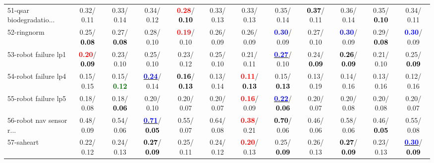 \begin{table}[h]
\begin{center}
{\begin{tabular}{lc|c|c|c|c|c|c|c|c|c|c}
51-qsar biodegradatio... &   0.32/  0.11 &   0.33/  0.14 &   0.34/  0.12 & \textcolor{red}{\textbf{  0.28}}/\textcolor{black}{\textbf{  0.10}} &   0.33/  0.13 &   0.33/  0.13 &   0.35/  0.14 & \textcolor{black}{\textbf{  0.37}}/  0.11 &   0.36/  0.14 &   0.35/\textcolor{black}{\textbf{  0.10}} &   0.34/  0.11 \\
52-ringnorm &   0.25/\textcolor{black}{\textbf{  0.08}} &   0.27/\textcolor{black}{\textbf{  0.08}} &   0.28/  0.10 & \textcolor{red}{\textbf{  0.19}}/  0.10 &   0.26/  0.09 &   0.26/  0.09 & \textcolor{blue}{\textbf{  0.30}}/  0.09 &   0.27/  0.10 & \textcolor{blue}{\textbf{  0.30}}/  0.09 &   0.29/\textcolor{black}{\textbf{  0.08}} & \textcolor{blue}{\textbf{  0.30}}/  0.09 \\
53-robot failure lp1 & \textcolor{red}{\textbf{  0.20}}/\textcolor{black}{\textbf{  0.09}} &   0.23/  0.10 &   0.25/  0.10 &   0.23/  0.12 &   0.25/  0.10 &   0.21/  0.11 & \underline{\textcolor{blue}{\textbf{  0.27}}}/  0.10 &   0.24/\textcolor{black}{\textbf{  0.09}} & \textcolor{black}{\textbf{  0.26}}/\textcolor{black}{\textbf{  0.09}} &   0.21/  0.10 &   0.25/\textcolor{black}{\textbf{  0.09}} \\ \hline
54-robot failure lp4 &   0.15/  0.15 &   0.15/\textcolor{darkgreen}{\textbf{  0.12}} & \underline{\textcolor{blue}{\textbf{  0.24}}}/  0.14 & \textcolor{black}{\textbf{  0.16}}/\textcolor{black}{\textbf{  0.13}} &   0.13/  0.14 & \textcolor{red}{\textbf{  0.11}}/\textcolor{black}{\textbf{  0.13}} &   0.15/\textcolor{black}{\textbf{  0.13}} &   0.13/  0.19 &   0.14/  0.16 &   0.13/  0.16 &   0.12/  0.16 \\
55-robot failure lp5 &   0.18/  0.08 &   0.18/\textcolor{black}{\textbf{  0.06}} &   0.20/  0.10 &   0.20/  0.07 &   0.20/  0.07 & \textcolor{red}{\textbf{  0.16}}/  0.09 & \underline{\textcolor{blue}{\textbf{  0.22}}}/\textcolor{black}{\textbf{  0.06}} &   0.20/  0.07 &   0.20/  0.08 &   0.20/  0.08 &   0.20/  0.07 \\
56-robot nav sensor r... &   0.48/  0.09 &   0.54/  0.06 & \underline{\textcolor{blue}{\textbf{  0.71}}}/\textcolor{black}{\textbf{  0.05}} &   0.55/  0.07 &   0.64/  0.08 & \textcolor{red}{\textbf{  0.38}}/  0.21 & \textcolor{black}{\textbf{  0.70}}/  0.06 &   0.46/  0.06 &   0.58/  0.06 &   0.46/\textcolor{black}{\textbf{  0.05}} &   0.55/  0.08 \\
57-saheart &   0.22/  0.12 &   0.24/  0.13 & \textcolor{black}{\textbf{  0.27}}/\textcolor{black}{\textbf{  0.09}} &   0.25/  0.11 &   0.24/  0.12 & \textcolor{red}{\textbf{  0.20}}/  0.13 &   0.25/\textcolor{black}{\textbf{  0.09}} &   0.26/  0.13 & \textcolor{black}{\textbf{  0.27}}/\textcolor{black}{\textbf{  0.09}} &   0.23/  0.13 & \underline{\textcolor{blue}{\textbf{  0.30}}}/\textcolor{black}{\textbf{  0.09}} \\

\end{tabular}}
\end{center}
\end{table}
